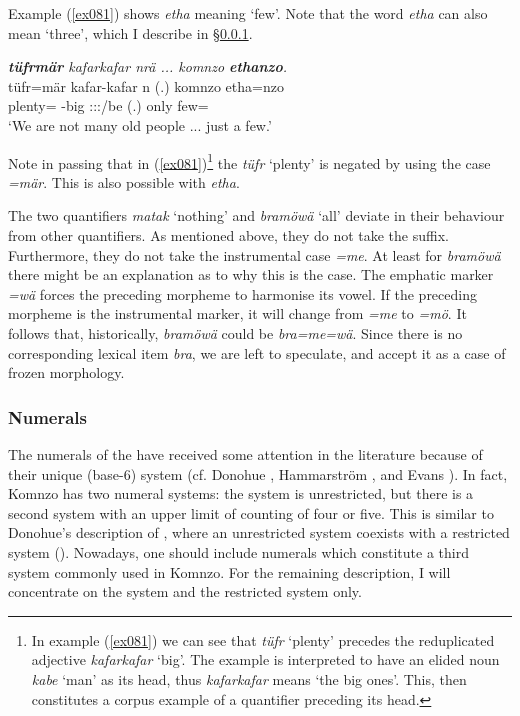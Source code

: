 Example (\ref{ex081}) shows \emph{etha} meaning `few'. Note that the word \emph{etha} can also mean `three', which I describe in \S{}\ref{numerals}.

\begin{exe}
	\ex \emph{\textbf{tüfrmär} kafarkafar nrä ... komnzo \textbf{ethanzo}.}\\
	\gll tüfr=mär kafar-kafar n (.) komnzo etha=nzo\\
	plenty=\Priv{} \Redup{}-big \Fpl:\Sbj:\Nonpast:\Ipfv/be (.) only few=\Only{}\\
	\trans `We are not many old people ... just a few.'
	\label{ex081}
\end{exe}

Note in passing that in (\ref{ex081})\footnote{\label{foot1}In example (\ref{ex081}) we can see that \emph{tüfr} `plenty' precedes the reduplicated adjective \emph{kafarkafar} `big'. The example is interpreted to have an elided noun \emph{kabe} `man' as its head, thus \emph{kafarkafar} means `the big ones'. This, then constitutes a corpus example of a quantifier preceding its head.} the  \emph{tüfr} `plenty' is negated by using the  case \emph{=mär}. This is also possible with \emph{etha}.%

The two quantifiers \emph{matak} `nothing' and \emph{bramöwä} `all' deviate in their behaviour from other quantifiers. As mentioned above, they do not take the  suffix. Furthermore, they do not take the instrumental case \emph{=me}. At least for \emph{bramöwä} there might be an explanation as to why this is the case. The emphatic marker \emph{=wä} forces the preceding morpheme to harmonise its vowel. If the preceding morpheme is the instrumental marker, it will change from \emph{=me} to \emph{=mö}. It follows that, historically, \emph{bramöwä} could be \emph{bra=me=wä}. Since there is no corresponding lexical item \emph{bra}, we are left to speculate, and accept it as a case of frozen morphology.

\subsubsection{Numerals} \label{numerals}

The numerals of the  have received some attention in the literature because of their unique  (base-6) system (cf. Donohue \citeyear{Donohue:2008bn}, Hammarström \citeyear{Hammarstrom:2009bp}, and Evans \citeyear{Evans:2009wg}). In fact, Komnzo has two numeral systems: the  system is unrestricted, but there is a second system with an upper limit of counting of four or five. This is similar to Donohue's description of , where an unrestricted system coexists with a restricted system (\citealt{Donohue:2008bn}). Nowadays, one should include  numerals which constitute a third system commonly used in Komnzo. For the remaining description, I will concentrate on the  system and the restricted system only.%


